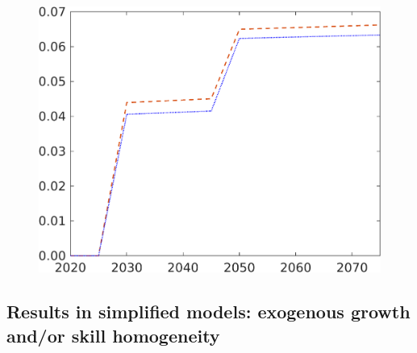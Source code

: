 \begin{figure}[h!!]
\begin{minipage}[]{0.32\textwidth}
	\end{minipage}
	\begin{minipage}[]{0.32\textwidth}
		\includegraphics[width=1\textwidth]{../../codding_model/own_basedOnFried/optimalPol_190722_tidiedUp/figures/all_July22/GovCon_DDCompEffOPT_T_NoTaus_pol3_spillover0_noskill0_sep1_xgrowth0_etaa0.79_lgd0_lff0.png}
	\end{minipage}
\end{figure}

\subsection{Results in simplified models: exogenous growth and/or skill homogeneity}

